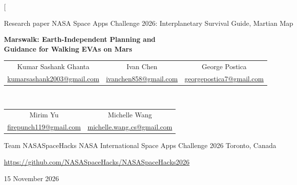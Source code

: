 \documentclass[10pt,twocolumn]{article}
\makeatletter
\newcommand{\PaperAuthors}{%
  \begin{tabular}{@{}c@{\hspace{2.2em}}c@{\hspace{2.2em}}c@{}}
    Kumar Sashank Ghanta & Ivan Chen & George Postica \\[-1pt]
    {\footnotesize\color{muted}\href{mailto:kumarsashank2003@gmail.com}{kumarsashank2003@gmail.com}} &
    {\footnotesize\color{muted}\href{mailto:ivanchen858@gmail.com}{ivanchen858@gmail.com}} &
    {\footnotesize\color{muted}\href{mailto:georgepostica7@gmail.com}{georgepostica7@gmail.com}} \\[5pt]
  \end{tabular}\\
  \begin{tabular}{@{}c@{\hspace{2.2em}}c@{}}
    Mirim Yu & Michelle Wang \\[-1pt]
    {\footnotesize\color{muted}\href{mailto:firepunch119@gmail.com}{firepunch119@gmail.com}} &
    {\footnotesize\color{muted}\href{mailto:michelle.wang.cs@gmail.com}{michelle.wang.cs@gmail.com}} \\
  \end{tabular}}
\newcommand{\PaperAffiliation}{Team NASASpaceHacks \textperiodcentered{} NASA International Space Apps Challenge 2026 \textperiodcentered{} Toronto, Canada}
\newcommand{\PaperRepo}{\url{https://github.com/NASASpaceHacks/NASASpaceHacks2026}}
\makeatother
\begin{document}
\thispagestyle{plain}

\twocolumn[{%
\begin{center}
  {\sffamily\small\color{muted} Research paper \textperiodcentered{} NASA Space Apps Challenge 2026: Interplanetary Survival Guide, Martian Map\par}
  \vspace{10pt}
  {\LARGE\bfseries\color{ink} Marswalk: Earth-Independent Planning and\\[3pt] Guidance for Walking EVAs on Mars\par}
  \vspace{12pt}
  {\large \PaperAuthors\par}
  \vspace{4pt}
  {\small\color{muted} \PaperAffiliation\par}
  \vspace{2pt}
  {\small \PaperRepo\par}
  \vspace{2pt}
  {\small\color{muted} 15 November 2026\par}
\end{center}

}
\end{document}
